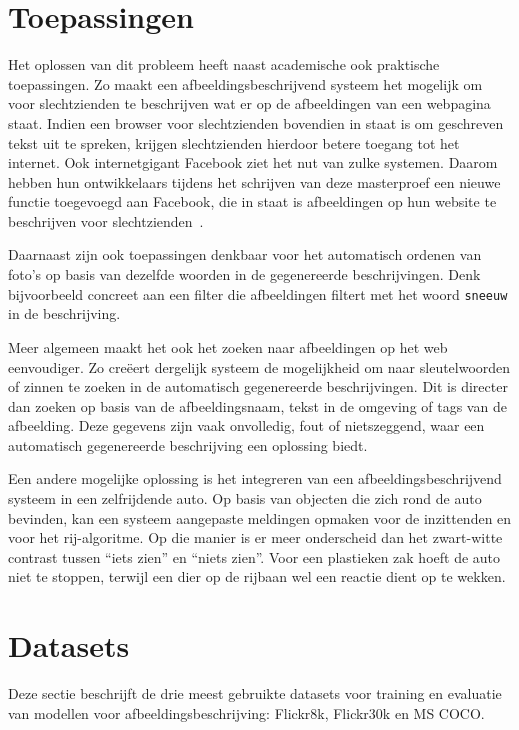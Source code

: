 \section{Toepassingen}
Het oplossen van dit probleem heeft naast academische ook praktische toepassingen. Zo maakt een afbeeldingsbeschrijvend systeem het mogelijk om voor slechtzienden te beschrijven wat er op de afbeeldingen van een webpagina staat. Indien een browser voor slechtzienden bovendien in staat is om geschreven tekst uit te spreken, krijgen slechtzienden hierdoor betere toegang tot het internet. Ook internetgigant Facebook ziet het nut van zulke systemen. Daarom hebben hun ontwikkelaars tijdens het schrijven van deze masterproef een nieuwe functie toegevoegd aan Facebook, die in staat is afbeeldingen op hun website te beschrijven voor slechtzienden~\cite{facebook}.

Daarnaast zijn ook toepassingen denkbaar voor het automatisch ordenen van foto's op basis van dezelfde woorden in de gegenereerde beschrijvingen. Denk bijvoorbeeld concreet aan een filter die afbeeldingen filtert met het woord \texttt{sneeuw} in de beschrijving. 

Meer algemeen maakt het ook het zoeken naar afbeeldingen op het web eenvoudiger. Zo cre\"eert dergelijk systeem de mogelijkheid om naar sleutelwoorden of zinnen te zoeken in de automatisch gegenereerde beschrijvingen. Dit is directer dan zoeken op basis van de afbeeldingsnaam, tekst in de omgeving of tags van de afbeelding. Deze gegevens zijn vaak onvolledig, fout of nietszeggend, waar een automatisch gegenereerde beschrijving een oplossing biedt.

Een andere mogelijke oplossing is het integreren van een afbeeldingsbeschrijvend systeem in een zelfrijdende auto. Op basis van objecten die zich rond de auto bevinden, kan een systeem aangepaste meldingen opmaken voor de inzittenden en voor het rij-algoritme. Op die manier is er meer onderscheid dan het zwart-witte contrast tussen ``iets zien'' en ``niets zien''. Voor een plastieken zak hoeft de auto niet te stoppen, terwijl een dier op de rijbaan wel een reactie dient op te wekken.

\section{Datasets}
\label{sec:Datasets}
Deze sectie beschrijft de drie meest gebruikte datasets voor training en evaluatie van modellen voor afbeeldingsbeschrijving: Flickr8k, Flickr30k en MS COCO.


